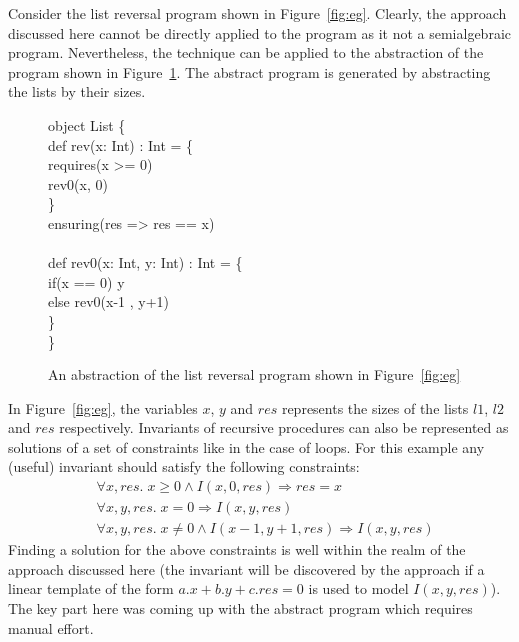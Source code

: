 Consider the list reversal program shown in Figure~\ref{fig:eg}. Clearly, the approach discussed here cannot be directly applied to the program as it not a semialgebraic program. Nevertheless, the technique can be applied to the abstraction of the program shown in Figure~\ref{fig:absRev}. The abstract program is generated
by abstracting the lists by their sizes. 
%
\begin{figure}
\begin{myprogram}
object List \{ \\
\pnl \>    def rev(x: Int) : Int = \{ \\
\pnl \> 	requires(x >= 0) \\
\pnl \> \>      rev0(x, 0)  \\
\pnl \>    \} \\
\pnl \>    ensuring(res => res == x)\\
\\    
\pnl \>    def rev0(x: Int, y: Int) : Int = \{ \\
\pnl \> \>      if(x == 0) y  \\
\pnl \> \>      else rev0(x-1 , y+1) \\
\pnl \>    \} \\ 
\}
\end{myprogram}
\caption{An abstraction of the list reversal program shown in Figure~\ref{fig:eg}} \label{fig:absRev}
\end{figure}
%
In Figure~\ref{fig:eg}, the variables $x$, $y$ and $res$ represents the 
sizes of the lists $l1$, $l2$ and $res$ respectively.
Invariants of recursive procedures can also be represented as solutions 
of a set of constraints like in the case of loops.
For this example any (useful) invariant should satisfy the following constraints:
%
\begin{align}
& \forall x,res. \; x \ge 0 \wedge I(x,0,res) \Rightarrow res = x \\
& \forall x,y,res. \; x = 0 \Rightarrow I(x,y,res) \\
& \forall x,y,res. \; x \ne 0 \wedge I(x-1,y+1,res) \Rightarrow I(x,y,res)
\end{align}
%
Finding a solution for the above constraints is well within the realm of the approach discussed here (the invariant will be discovered by the approach if a linear template of the form $a.x+b.y+c.res = 0$ is used to model $I(x,y,res)$). The key part here was coming up with the abstract program which requires manual effort.


